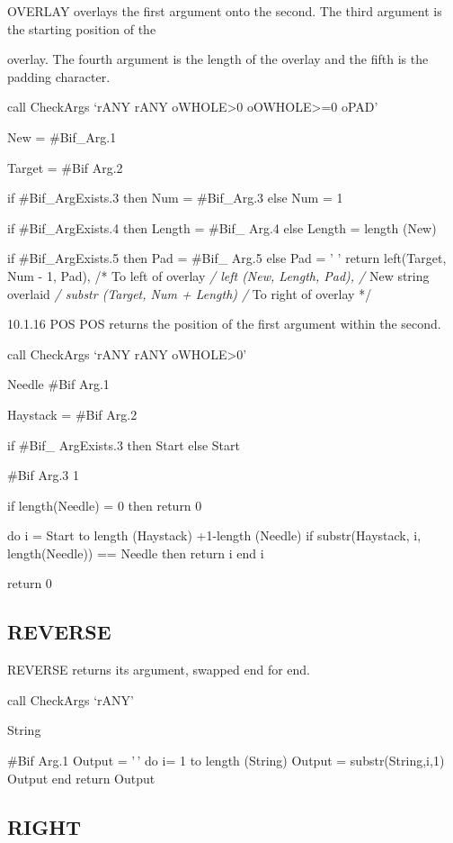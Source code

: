 OVERLAY overlays the first argument onto the second. The third argument
is the starting position of the

overlay. The fourth argument is the length of the overlay and the fifth
is the padding character.

call CheckArgs `rANY rANY oWHOLE\textgreater0 oOWHOLE\textgreater=0
oPAD'

New = \#Bif\_Arg.1

Target = \#Bif Arg.2

if \#Bif\_ArgExists.3 then Num = \#Bif\_Arg.3 else Num = 1

if \#Bif\_ArgExists.4 then Length = \#Bif\_ Arg.4 else Length = length
(New)

if \#Bif\_ArgExists.5 then Pad = \#Bif\_ Arg.5 else Pad = ' ' return
left(Target, Num - 1, Pad), /* To left of overlay \emph{/
\textbar\textbar{} left (New, Length, Pad), /} New string overlaid
\emph{/ \textbar\textbar{} substr (Target, Num + Length) /} To right of
overlay */

10.1.16 POS POS returns the position of the first argument within the
second.

call CheckArgs `rANY rANY oWHOLE\textgreater0'

Needle \#Bif Arg.1

Haystack = \#Bif Arg.2

if \#Bif\_ ArgExists.3 then Start else Start

\#Bif Arg.3 1

if length(Needle) = 0 then return 0

do i = Start to length (Haystack) +1-length (Needle) if substr(Haystack,
i, length(Needle)) == Needle then return i end i

return 0

\subsection{REVERSE}\label{reverse}

REVERSE returns its argument, swapped end for end.

call CheckArgs `rANY'

String

\#Bif Arg.1 Output = '\,' do i= 1 to length (String) Output =
substr(String,i,1) \textbar\textbar{} Output end return Output

\subsection{RIGHT}\label{right}

